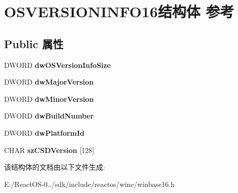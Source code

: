 \hypertarget{struct_o_s_v_e_r_s_i_o_n_i_n_f_o16}{}\section{O\+S\+V\+E\+R\+S\+I\+O\+N\+I\+N\+F\+O16结构体 参考}
\label{struct_o_s_v_e_r_s_i_o_n_i_n_f_o16}
\subsection*{Public 属性}
\begin{DoxyCompactItemize}
\item 
\mbox{\label{struct_o_s_v_e_r_s_i_o_n_i_n_f_o16_a2a5620f4d897c7d751d47611800e6e95}} 
D\+W\+O\+RD {\bfseries dw\+O\+S\+Version\+Info\+Size}
\item 
\mbox{\label{struct_o_s_v_e_r_s_i_o_n_i_n_f_o16_a18f2f4b669ad3193f54624eab594ec91}} 
D\+W\+O\+RD {\bfseries dw\+Major\+Version}
\item 
\mbox{\label{struct_o_s_v_e_r_s_i_o_n_i_n_f_o16_aac05ebd8fd0db2f778a5bfadda1e18e5}} 
D\+W\+O\+RD {\bfseries dw\+Minor\+Version}
\item 
\mbox{\label{struct_o_s_v_e_r_s_i_o_n_i_n_f_o16_a5bbe19d7ea6b47294d0e9153c0dc59bb}} 
D\+W\+O\+RD {\bfseries dw\+Build\+Number}
\item 
\mbox{\label{struct_o_s_v_e_r_s_i_o_n_i_n_f_o16_a0c75af73a0b34f572cc2176f072cf1ad}} 
D\+W\+O\+RD {\bfseries dw\+Platform\+Id}
\item 
\mbox{\label{struct_o_s_v_e_r_s_i_o_n_i_n_f_o16_a3f30c84f4ef2855d7747d29bc9307400}} 
C\+H\+AR {\bfseries sz\+C\+S\+D\+Version} \mbox{[}128\mbox{]}
\end{DoxyCompactItemize}


该结构体的文档由以下文件生成\+:\begin{DoxyCompactItemize}
\item 
E\+:/\+React\+O\+S-\/0../sdk/include/reactos/wine/winbase16.\+h\end{DoxyCompactItemize}
